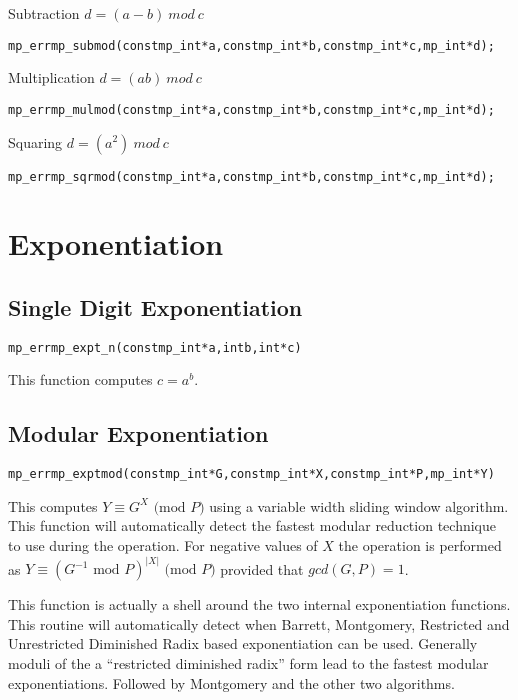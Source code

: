 \documentclass[synpaper]{book}
\def\mod{{\mathit\ mod\ }}
\begin{document}
Subtraction  $d = (a - b) \mod c$
\begin{alltt}
mp_err mp_submod(const mp_int *a, const mp_int *b, const mp_int *c, mp_int *d);
\end{alltt}

Multiplication $d = (ab) \mod c$
\begin{alltt}
mp_err mp_mulmod(const mp_int *a, const mp_int *b, const mp_int *c, mp_int *d);
\end{alltt}

Squaring  $d = (a^2) \mod c$
\begin{alltt}
mp_err mp_sqrmod(const mp_int *a, const mp_int *b, const mp_int *c, mp_int *d);
\end{alltt}

\chapter{Exponentiation}
\section{Single Digit Exponentiation}
\begin{alltt}
mp_err mp_expt_n(const mp_int *a, int b, int *c)
\end{alltt}
This function computes $c = a^b$.

\section{Modular Exponentiation}
\begin{alltt}
mp_err mp_exptmod (const mp_int *G, const mp_int *X, const mp_int *P, mp_int *Y)
\end{alltt}
This computes $Y \equiv G^X \mbox{ (mod }P\mbox{)}$ using a variable width sliding window
algorithm.  This function will automatically detect the fastest modular reduction technique to use
during the operation. For negative values of $X$ the operation is performed as $Y \equiv (G^{-1}
  \mbox{ mod }P)^{\vert X \vert} \mbox{ (mod }P\mbox{)}$ provided that $gcd(G, P) = 1$.

This function is actually a shell around the two internal exponentiation functions.  This routine
will automatically detect when Barrett, Montgomery, Restricted and Unrestricted Diminished Radix
based exponentiation can be used.  Generally moduli of the a ``restricted diminished radix'' form
lead to the fastest modular exponentiations. Followed by Montgomery and the other two algorithms.
\end{document}
